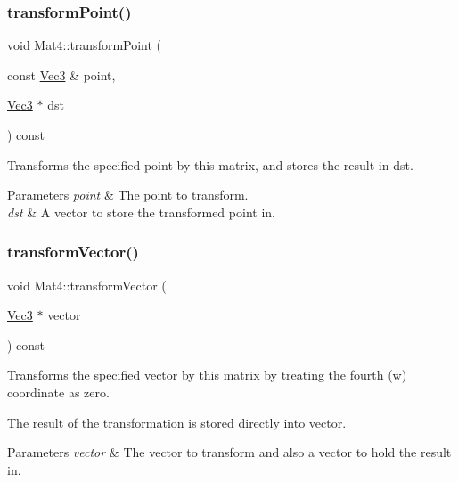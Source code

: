 \subsubsection{\texorpdfstring{transform\+Point()}{transformPoint()}\hspace{0.1cm}{\footnotesize\ttfamily [4/4]}}
{\footnotesize\ttfamily void Mat4\+::transform\+Point (\begin{DoxyParamCaption}\item[{const \hyperlink{classVec3}{Vec3} \&}]{point,  }\item[{\hyperlink{classVec3}{Vec3} $\ast$}]{dst }\end{DoxyParamCaption}) const\hspace{0.3cm}{\ttfamily [inline]}}

Transforms the specified point by this matrix, and stores the result in dst.


\begin{DoxyParams}{Parameters}
{\em point} & The point to transform. \\
\hline
{\em dst} & A vector to store the transformed point in. \\
\hline
\end{DoxyParams}
\mbox{\label{classMat4_a2f5efde7152fb9e50d1e8fd45e7012bb}} 
\subsubsection{\texorpdfstring{transform\+Vector()}{transformVector()}\hspace{0.1cm}{\footnotesize\ttfamily [1/10]}}
{\footnotesize\ttfamily void Mat4\+::transform\+Vector (\begin{DoxyParamCaption}\item[{\hyperlink{classVec3}{Vec3} $\ast$}]{vector }\end{DoxyParamCaption}) const}

Transforms the specified vector by this matrix by treating the fourth (w) coordinate as zero.

The result of the transformation is stored directly into vector.


\begin{DoxyParams}{Parameters}
{\em vector} & The vector to transform and also a vector to hold the result in. \\
\hline
\end{DoxyParams}
\mbox{\label{classMat4_a2f5efde7152fb9e50d1e8fd45e7012bb}} 
